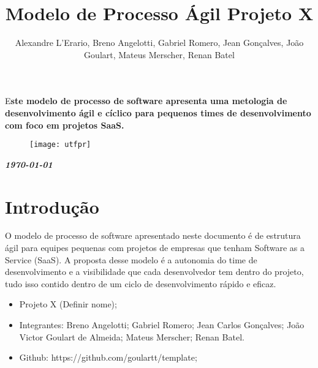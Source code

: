 \documentclass[	DIV=calc,%
							paper=a4,%
							fontsize=12pt,%
							onecolumn]{scrartcl}	 					%
\title{Modelo de Processo Ágil Projeto X}					%
\author{Alexandre L'Erario, Breno Angelotti, Gabriel Romero, Jean Gonçalves, João Goulart, Mateus Merscher, Renan Batel }  	%
\date{}																				%
\newcommand{\initial}[1]{%
     \lettrine[lines=3,lhang=0.3,nindent=0em]{
     				\color{DarkGoldenrod}
     				{\textsf{#1}}}{}}
\begin{document}
\maketitle
\thispagestyle{fancy} 	
\thispagestyle{empty}		%




\initial{E}\textbf{ste modelo de processo de software apresenta uma metologia de desenvolvimento ágil e cíclico para pequenos times de desenvolvimento com foco em projetos SaaS.}

\begin{figure}
	\centering
	\texttt{[image: utfpr]}
\end{figure}

\vspace{3cm}
\centerline{\textit{\textbf{\today}}}

\clearpage
    \renewcommand*\listfigurename{Lista de figuras}
\listoffigures

\renewcommand*\listtablename{Lista de tabelas}
\listoftables




\clearpage
\renewcommand{\contentsname}{Sumário}
\tableofcontents
\clearpage

\section{Introdução}
O modelo de processo de software apresentado neste documento é de estrutura ágil para equipes pequenas com projetos de empresas que tenham Software as a Service (SaaS). A proposta desse modelo é a autonomia do time de desenvolvimento e a visibilidade que cada desenvolvedor tem dentro do projeto, tudo isso contido dentro de um ciclo de desenvolvimento rápido e eficaz.

\begin{itemize}
	\item Projeto X (Definir nome);
	\item Integrantes: Breno Angelotti; Gabriel Romero; Jean Carlos Gonçalves; João Victor Goulart de Almeida; Mateus Merscher; Renan Batel.
	\item Github: https://github.com/goulartt/template;
\end{itemize}
\end{document}
